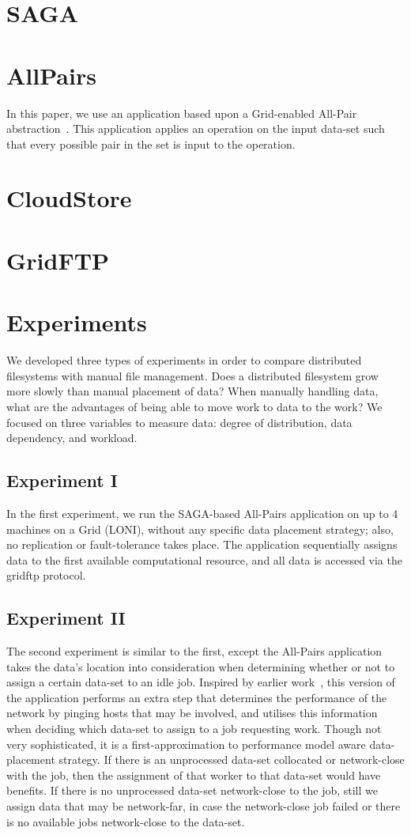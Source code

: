 \documentclass{rspublic}
\begin{document}
\section{SAGA}
\section{AllPairs}
In this paper, we use an application based upon a Grid-enabled All-Pair
abstraction~\citep{Interop, AllPairs}. This application applies an
operation on the input data-set such that every possible pair in the set
is input to the operation. 
\section{CloudStore}
\section{GridFTP}
\section{Experiments} We developed three types of experiments in order
to compare distributed filesystems with manual file management.  Does a
distributed filesystem grow more slowly than manual placement of data?
When manually handling data, what are the advantages of being able to
move work to data to the work?  We focused on three variables to measure
data:  degree of distribution, data dependency, and workload.

\subsection{Experiment I} In the first experiment, we run the SAGA-based
All-Pairs application on up to 4 machines on a Grid (LONI), without any
specific data placement strategy; also, no replication or
fault-tolerance takes place. The application sequentially assigns data
to the first available computational resource, and all data is accessed
via the gridftp protocol.
\subsection{Experiment II} The second experiment is similar to the
first, except the All-Pairs application takes the data's location into
consideration when determining whether or not to assign a certain
data-set to an idle job. Inspired by earlier work~\citep{netperf}, this
version of the application performs an extra step that determines the
performance of the network by pinging hosts that may be involved, and
utilises this information when deciding which data-set to assign to a
job requesting work. Though not very sophisticated, it is a
first-approximation to performance model aware data-placement strategy.
If there is an unprocessed data-set collocated or network-close with the
job, then the assignment of that worker to that data-set would have
benefits. If there is no unprocessed data-set network-close to the job,
still we assign data that may be network-far, in case the network-close
job failed or there is no available jobs network-close to the data-set.
\end{document}

